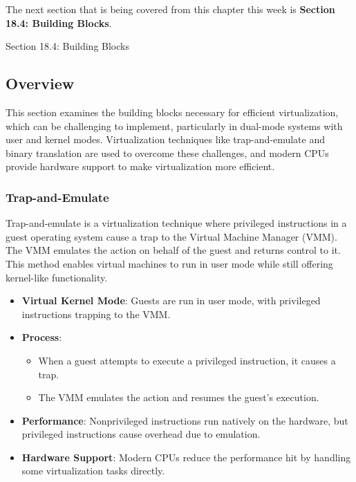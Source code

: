 The next section that is being covered from this chapter this week is \textbf{Section 18.4: Building Blocks}.

\begin{notes}{Section 18.4: Building Blocks}
    \subsection*{Overview}

    This section examines the building blocks necessary for efficient virtualization, which can be challenging to implement, particularly in dual-mode systems with user and kernel modes. Virtualization 
    techniques like trap-and-emulate and binary translation are used to overcome these challenges, and modern CPUs provide hardware support to make virtualization more efficient.
    
    \subsubsection*{Trap-and-Emulate}
    
    Trap-and-emulate is a virtualization technique where privileged instructions in a guest operating system cause a trap to the Virtual Machine Manager (VMM). The VMM emulates the action on behalf of 
    the guest and returns control to it. This method enables virtual machines to run in user mode while still offering kernel-like functionality.
    
    \begin{highlight}
    
        \begin{itemize}
            \item \textbf{Virtual Kernel Mode}: Guests are run in user mode, with privileged instructions trapping to the VMM.
            \item \textbf{Process}:
                \begin{itemize}
                    \item When a guest attempts to execute a privileged instruction, it causes a trap.
                    \item The VMM emulates the action and resumes the guest's execution.
                \end{itemize}
            \item \textbf{Performance}: Nonprivileged instructions run natively on the hardware, but privileged instructions cause overhead due to emulation.
            \item \textbf{Hardware Support}: Modern CPUs reduce the performance hit by handling some virtualization tasks directly.
        \end{itemize}
    

\end{highlight}
\end{notes}
